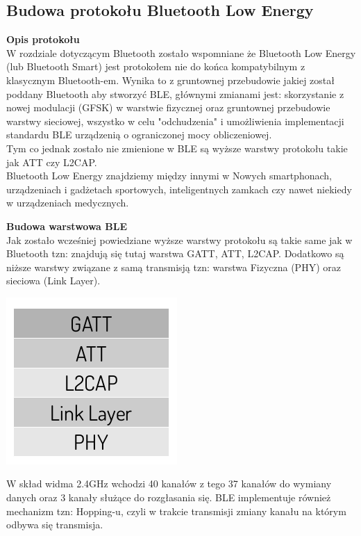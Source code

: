 \subsection{Budowa protokołu Bluetooth Low Energy}

\par
\tab \textbf{Opis protokołu} \\
\tab W rozdziale dotyczącym Bluetooth zostało wspomniane że Bluetooth Low Energy (lub Bluetooth Smart) jest protokołem nie do końca kompatybilnym z klasycznym Bluetooth-em. Wynika to z gruntownej przebudowie jakiej został poddany Bluetooth aby stworzyć BLE, głównymi zmianami jest: skorzystanie z nowej modulacji (GFSK) w warstwie fizycznej oraz gruntownej przebudowie warstwy sieciowej, wszystko w celu "odchudzenia" i umożliwienia implementacji standardu BLE urządzenią o ograniczonej mocy obliczeniowej. \\
Tym co jednak zostało nie zmienione w BLE są wyższe warstwy protokołu takie jak ATT czy L2CAP.\\
Bluetooth Low Energy znajdziemy między innymi w Nowych smartphonach, urządzeniach i gadżetach sportowych, inteligentnych zamkach czy nawet niekiedy w urządzeniach medycznych.\\

\par
\tab \textbf{Budowa warstwowa BLE} \\ 
\tab Jak zostało wcześniej powiedziane wyższe warstwy protokołu są takie same jak w Bluetooth tzn: znajdują się tutaj warstwa GATT, ATT, L2CAP. Dodatkowo są niższe warstwy związane z samą transmisją tzn: warstwa Fizyczna (PHY) oraz sieciowa (Link Layer).\\

\centerline{\includegraphics[scale=0.5]{./img/BLE_Stack.png}}

W skład widma 2.4GHz wchodzi 40 kanałów z tego 37 kanałów do wymiany danych oraz 3 kanały służące do rozgłasania się. BLE implementuje również mechanizm tzn: Hopping-u, czyli w trakcie transmisji zmiany kanału na którym odbywa się transmisja.\\

